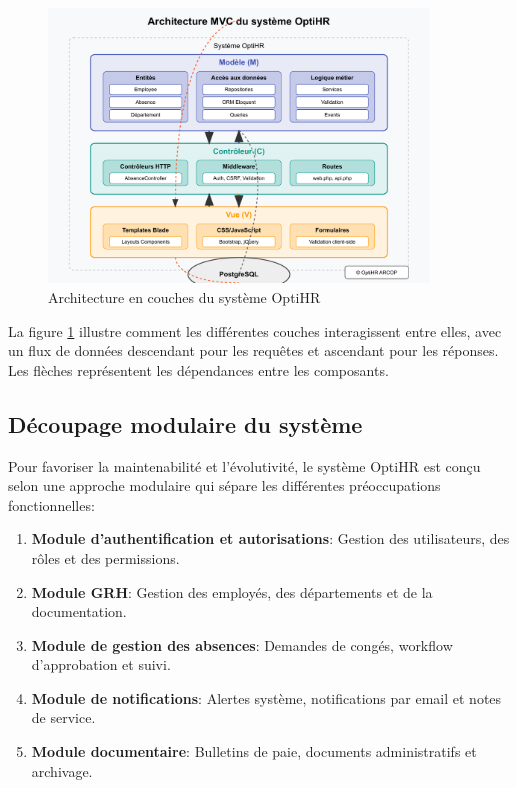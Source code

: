 \begin{figure}[H]
    \centering
    \includegraphics[width=0.9\textwidth]{images/diagrammes/architecture/architecture-couches.pdf}
    \caption{Architecture en couches du système OptiHR}
    \label{fig:architecture_couches}
\end{figure}

La figure \ref{fig:architecture_couches} illustre comment les différentes couches interagissent entre elles, avec un flux de données descendant pour les requêtes et ascendant pour les réponses. Les flèches représentent les dépendances entre les composants.

\subsection{Découpage modulaire du système}
Pour favoriser la maintenabilité et l'évolutivité, le système OptiHR est conçu selon une approche 
modulaire qui sépare les différentes préoccupations fonctionnelles:

\begin{enumerate}
    \item \textbf{Module d'authentification et autorisations}: Gestion des utilisateurs, des rôles et des permissions.
    \item \textbf{Module GRH}: Gestion des employés, des départements et de la documentation.
    \item \textbf{Module de gestion des absences}: Demandes de congés, workflow d'approbation et suivi.
    \item \textbf{Module de notifications}: Alertes système, notifications par email et notes de service.
    \item \textbf{Module documentaire}: Bulletins de paie, documents administratifs et archivage.
\end{enumerate}

